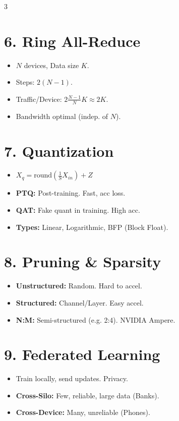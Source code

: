 \documentclass[8pt, a4paper, landscape]{article}
\begin{document}
\begin{multicols*}{3}
\section{6. Ring All-Reduce}
\begin{itemize}
    \item $N$ devices, Data size $K$.
    \item Steps: $2(N-1)$.
    \item Traffic/Device: $2 \frac{N-1}{N} K \approx 2K$.
    \item Bandwidth optimal (indep. of $N$).
\end{itemize}

\section{7. Quantization}
\begin{itemize}
    \item $X_q = \text{round}(\frac{1}{S} X_{in}) + Z$
    \item \textbf{PTQ:} Post-training. Fast, acc loss.
    \item \textbf{QAT:} Fake quant in training. High acc.
    \item \textbf{Types:} Linear, Logarithmic, BFP (Block Float).
\end{itemize}

\section{8. Pruning \& Sparsity}
\begin{itemize}
    \item \textbf{Unstructured:} Random. Hard to accel.
    \item \textbf{Structured:} Channel/Layer. Easy accel.
    \item \textbf{N:M:} Semi-structured (e.g. 2:4). NVIDIA Ampere.
\end{itemize}

\section{9. Federated Learning}
\begin{itemize}
    \item Train locally, send updates. Privacy.
    \item \textbf{Cross-Silo:} Few, reliable, large data (Banks).
    \item \textbf{Cross-Device:} Many, unreliable (Phones).
\end{itemize}


\end{multicols*}
\end{document}

